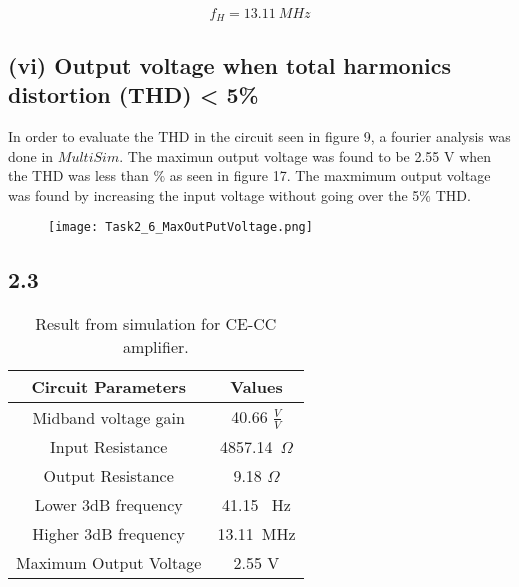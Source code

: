 	$$f_{H} = 13.11 \ M Hz $$
\pagebreak
  \subsection*{(vi) Output voltage when total harmonics distortion (THD) < 5\%}

  In order to evaluate the THD in the circuit seen in figure 9, a fourier analysis was done in $MultiSim$. The maximun output voltage was found to be 2.55 V when the THD was less than $\%$ as seen in figure 17. The maxmimum output voltage was found by increasing the input voltage without going over the 5$\%$ THD.	


	\begin{figure}[h!]
        \centering
        \texttt{[image: Task2\_6\_MaxOutPutVoltage.png]}
	\end{figure}
    
\pagebreak
  
\subsection*{2.3}
  
	\begin{table}[htbp]
     \centering
       \begin{tabular}{c|c}
        \hline
         Circuit Parameters & Values \\
       \hline
        Midband voltage gain          & 40.66 $\frac{V}{V}$ \\
        Input Resistance & 4857.14\ $\Omega$ \\
        Output Resistance & 9.18 $\Omega$\\
        Lower 3dB frequency & 41.15 \ Hz\\
        Higher 3dB frequency & 13.11\ MHz\\
        Maximum Output Voltage & 2.55 V\\
       \end{tabular}%
     \caption{Result from simulation for CE-CC amplifier.}
     \label{tab:addlabel}%
	\end{table}%

